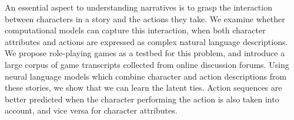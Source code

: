 An essential aspect to understanding narratives is to grasp the interaction between characters in a story and the actions they take. We examine whether computational models can capture this interaction, when both character attributes and actions are expressed as complex natural language descriptions. We propose role-playing games as a testbed for this problem, and introduce a large corpus of game transcripts collected from online discussion forums. Using neural language models which combine character and action descriptions from these stories, we show that we can learn the latent ties. Action sequences are better predicted when the character performing the action is also taken into account, and vice versa for character attributes.
